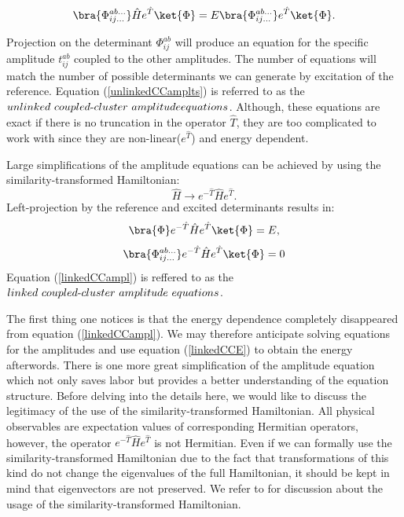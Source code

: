 \documentclass[twoside,english]{uiofysmaster}
\begin{document}
\begin{equation}\label{unlinkedCCE}
\bra{\Phi_{ij\dots}^{ab\dots}}\hat{H}e^{\hat{T}}\ket{\Phi} = E\bra{\Phi_{ij\dots}^{ab\dots}}e^{\hat{T}}\ket{\Phi}.
\end{equation}

Projection on the determinant ${\Phi_{ij}^{ab}}$ will produce an equation for the specific amplitude ${t_{ij}^{ab}}$ coupled to the other amplitudes. The number of equations will match the number of possible determinants we can generate by excitation of the reference. Equation (\ref{unlinkedCCamplts}) is referred to as the $unlinked\ coupled{\text -}cluster\ amplitude\\ equations$. Although, these equations are exact if there is no truncation in the operator $\hat{T}$, they are too complicated to work with since they are non-linear($e^{\hat{T}}$) and energy dependent.

Large simplifications of the amplitude equations can be achieved by using the  similarity-transformed Hamiltonian: 
\[
\hat{H} \rightarrow e^{-\hat{T}}\hat{H}e^{\hat{T}}.
\]
Left-projection by the reference and excited determinants results in:
\begin{equation}\label{linkedCCE}
	\bra{\Phi}e^{-\hat{T}}\hat{H}e^{\hat{T}}\ket{\Phi} = E,
\end{equation}
\begin{equation}\label{linkedCCampl}
\bra{\Phi_{ij\dots}^{ab\dots}}e^{-\hat{T}}\hat{H}e^{\hat{T}}\ket{\Phi} = 0
\end{equation}
Equation (\ref{linkedCCampl}) is reffered to as the $linked\ coupled{\text -}cluster\ amplitude\ equations$.


The first thing one notices is that the energy dependence completely disappeared from equation (\ref{linkedCCampl}).
We may therefore anticipate solving equations for the amplitudes and use equation (\ref{linkedCCE}) to obtain the energy afterwords.
There is one more great simplification of the amplitude equation which not only saves labor but provides a better understanding of the equation structure. Before delving into the details here, we would like to discuss the legitimacy of the use of the similarity-transformed Hamiltonian. All physical observables are expectation values of corresponding Hermitian operators, however, the operator $e^{-\hat{T}}\hat{H}e^{\hat{T}}$ is not Hermitian.
Even if we can formally use the similarity-transformed Hamiltonian due to the fact that transformations of this kind do not change the eigenvalues of the full Hamiltonian, it should be kept in mind that eigenvectors are not preserved. We refer to \cite{Stantonequationmotioncoupled1993} for discussion about the usage of the similarity-transformed Hamiltonian.
\end{document}

